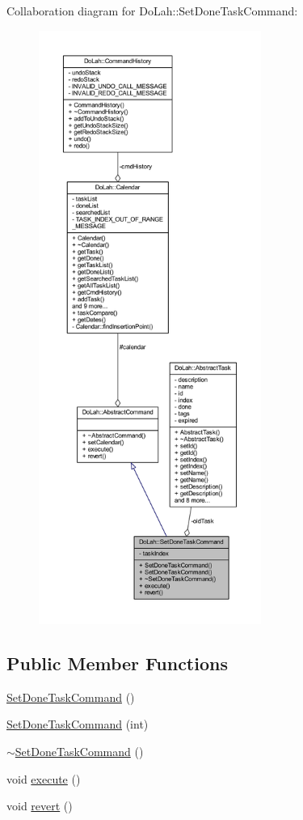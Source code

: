 Collaboration diagram for Do\+Lah\+:\+:Set\+Done\+Task\+Command\+:\nopagebreak
\begin{figure}[H]
\begin{center}
\leavevmode
\includegraphics[height=550pt]{class_do_lah_1_1_set_done_task_command__coll__graph}
\end{center}
\end{figure}
\subsection*{Public Member Functions}
\begin{DoxyCompactItemize}
\item 
\hyperlink{class_do_lah_1_1_set_done_task_command_ab72083266da497c56e0ada3390bc3737}{Set\+Done\+Task\+Command} ()
\item 
\hyperlink{class_do_lah_1_1_set_done_task_command_a15bbe8b9be76109759f076ebe0e022fd}{Set\+Done\+Task\+Command} (int)
\item 
\hyperlink{class_do_lah_1_1_set_done_task_command_a6753bae40df656cf4b0abead7e08fd9e}{$\sim$\+Set\+Done\+Task\+Command} ()
\item 
void \hyperlink{class_do_lah_1_1_set_done_task_command_a487762c0643f1b49fd61349fe1d6549e}{execute} ()
\item 
void \hyperlink{class_do_lah_1_1_set_done_task_command_a93aa0d32b0cb2a5588a6ded7118bf926}{revert} ()
\end{DoxyCompactItemize}
